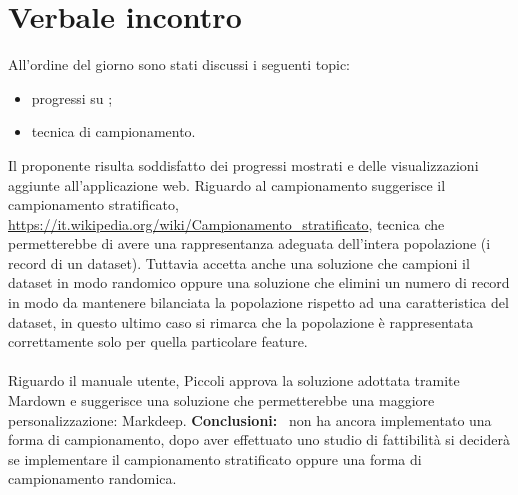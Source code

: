 \section{Verbale incontro}
All'ordine del giorno sono stati discussi i seguenti topic:
\begin{itemize}
    \item progressi su \hd ;
    \item tecnica di campionamento.
\end{itemize}
Il proponente risulta soddisfatto dei progressi mostrati e delle visualizzazioni aggiunte all'applicazione web. Riguardo al campionamento suggerisce il campionamento stratificato, \url{https://it.wikipedia.org/wiki/Campionamento_stratificato}, tecnica che permetterebbe di avere una rappresentanza adeguata dell'intera popolazione (i record di un dataset). Tuttavia accetta anche una soluzione che campioni il dataset in modo randomico oppure una soluzione che elimini un numero di record in modo da mantenere bilanciata la popolazione rispetto ad una caratteristica del dataset, in questo ultimo caso si rimarca che la popolazione è rappresentata correttamente solo per quella particolare feature.
\\ \\ 
\noindent
Riguardo il manuale utente, Piccoli approva la soluzione adottata tramite Mardown e suggerisce una soluzione che permetterebbe una maggiore personalizzazione: Markdeep.
\noindent \textbf{Conclusioni:}
\cod\ non ha ancora implementato una forma di campionamento, dopo aver effettuato uno studio di fattibilità si deciderà se implementare il campionamento stratificato oppure una forma di campionamento randomica.